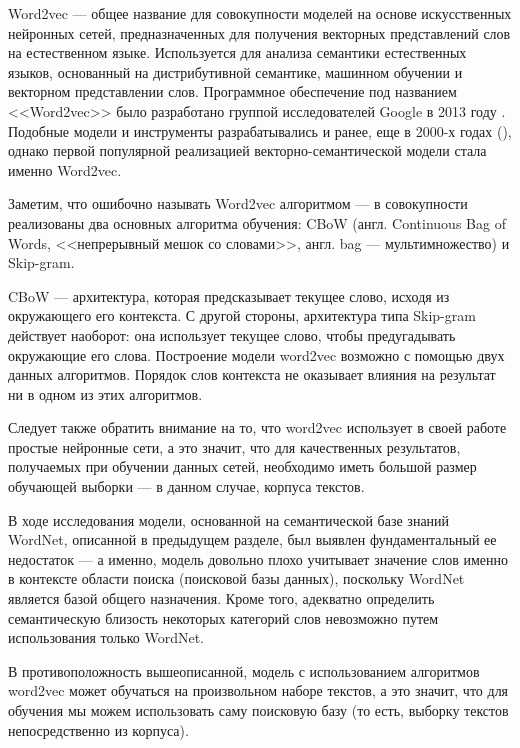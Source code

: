 Word2vec --- общее название для совокупности моделей на основе искусственных нейронных сетей, предназначенных для получения
векторных представлений слов на естественном языке. Используется для анализа семантики естественных языков, основанный
на дистрибутивной семантике, машинном обучении и векторном представлении слов. Программное обеспечение под названием
<<Word2vec>> было разработано группой исследователей Google в 2013 году \cite{mikolov-etal-2013-linguistic,mikolov2013efficient}.
Подобные модели и инструменты разрабатывались и ранее, еще в 2000-х годах (\cite{bengio2003neural,collobert2008}),
однако первой популярной реализацией векторно-семантической модели стала именно Word2vec.

Заметим, что ошибочно называть Word2vec алгоритмом --- в совокупности реализованы два основных алгоритма обучения:
CBoW (англ. Continuous Bag of Words, <<непрерывный мешок со словами>>, англ. bag --- мультимножество)
и Skip-gram.

CBoW --- архитектура, которая предсказывает текущее слово, исходя из окружающего его контекста. С другой стороны, архитектура
типа Skip-gram действует наоборот: она использует текущее слово, чтобы предугадывать окружающие его слова.
Построение модели word2vec возможно с помощью двух данных алгоритмов.
Порядок слов контекста не оказывает влияния на результат ни в одном из этих алгоритмов.

Следует также обратить внимание на то, что word2vec использует в своей работе простые нейронные сети, а это значит,
что для качественных результатов, получаемых при обучении данных сетей, необходимо иметь большой размер обучающей выборки ---
в данном случае, корпуса текстов.

В ходе исследования модели, основанной на семантической базе знаний WordNet, описанной в предыдущем разделе, был выявлен 
фундаментальный ее недостаток --- а именно, модель довольно плохо учитывает значение слов именно в контексте области поиска
(поисковой базы данных), поскольку WordNet является базой общего назначения. Кроме того, адекватно определить семантическую 
близость некоторых категорий слов невозможно путем использования только WordNet.

В противоположность вышеописанной, модель с использованием алгоритмов word2vec может обучаться на произвольном наборе текстов,
а это значит, что для обучения мы можем использовать саму поисковую базу (то есть, выборку текстов непосредственно из корпуса).